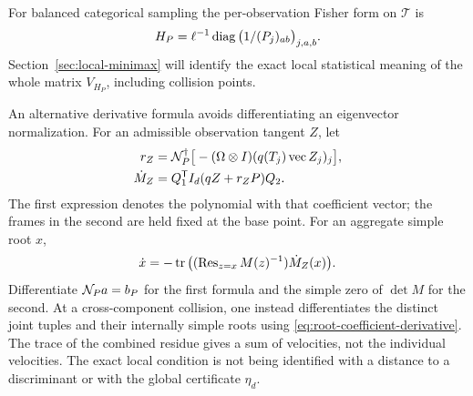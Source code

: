 For balanced categorical sampling the per-observation Fisher form on
$\mathcal T$ is
\[
 H_P=\ell^{-1}\operatorname{diag}\big(1/(P_j)_{ab}\big)_{j,a,b}.
\]
Section~\ref{sec:local-minimax} will identify the exact local statistical
meaning of the whole matrix $V_{H_P}$, including collision points.

An alternative derivative formula avoids differentiating an eigenvector
normalization. For an admissible observation tangent $Z$, let
\begin{align}
 r_Z&=\mathcal N_P^\dagger\big[-(\Omega\otimes I)
                    (q(T_j)\operatorname{vec}Z_j)_j\big],
                                      \label{eq:normal-tangent}\\
 \dot M_Z&=Q_1^{\mathsf T}I_d(qZ+r_ZP)Q_2.\nonumber
\end{align}
The first expression denotes the polynomial with that coefficient
vector; the frames in the second are held fixed at the base point.
For an aggregate simple root $x$,
\begin{equation}\label{eq:root-tangent}
 \dot x=-\operatorname{tr}\big((\operatorname{Res}_{z=x}M(z)^{-1})\dot M_Z(x)\big).
\end{equation}
Differentiate $\mathcal N_Pa=b_P$ for the first formula and the simple zero
of $\det M$ for the second. At a cross-component collision, one instead
differentiates the distinct joint tuples and their internally simple
roots using \eqref{eq:root-coefficient-derivative}. The trace of the
combined residue gives a sum of velocities, not the individual
velocities. The exact local condition is not being identified with a
distance to a discriminant or with the global certificate $\eta_d$.
